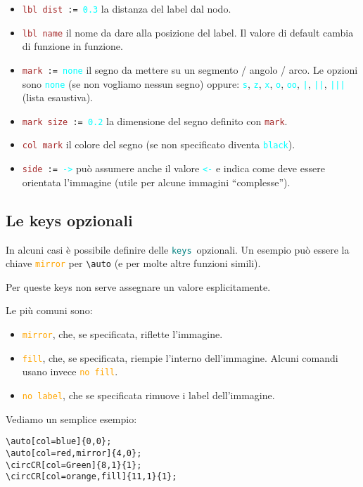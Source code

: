 \documentclass[italian, a4paper]{article}
\newcommand{\bs}{\textbackslash}
\newcommand{\ttt}[1]{\texttt{#1}}
\newcommand{\cyan}[1]{\textcolor{cyan}{#1}}
\newcommand{\keys}{\textcolor{teal}{\ttt{keys}}}
\newcommand{\key}[1]{\textcolor{brown}{\ttt{#1}}}
\newcommand{\keyop}[1]{\textcolor{orange}{\ttt{#1}}}
\newcommand{\keyval}[1]{\cyan{\ttt{#1}}}
\begin{document}
\begin{itemize}
\item \ttt{\key{lbl dist} := \keyval{0.3}} la distanza del label dal nodo.
\item \key{lbl name} il nome da dare alla posizione del label. Il valore di default cambia di funzione in funzione.
\item \ttt{\key{mark} := \keyval{none}} il segno da mettere su un segmento / angolo / arco. Le opzioni sono \keyval{none} (se non vogliamo nessun segno) oppure: \keyval{s}, \keyval{z}, \keyval{x}, \keyval{o}, \keyval{oo}, \keyval{|}, \keyval{||}, \keyval{|||} (lista esaustiva).
\item \ttt{\key{mark size} := \keyval{0.2}} la dimensione del segno definito con \key{mark}.
\item \key{col mark} il colore del segno (se non specificato diventa \keyval{black}).
\item \ttt{\key{side} := \keyval{->}} può assumere anche il valore \keyval{<-} e indica come deve essere orientata l'immagine (utile per alcune immagini ``complesse'').
\end{itemize}

\subsection{Le keys opzionali}
In alcuni casi è possibile definire delle \keys\ opzionali. Un esempio può essere la chiave \keyop{mirror} per \ttt{\bs auto} (e per molte altre funzioni simili).

Per queste keys non serve assegnare un valore esplicitamente.

Le più comuni sono:
\begin{itemize}[nolistsep]
\item \keyop{mirror}, che, se specificata, riflette l'immagine.
\item \keyop{fill}, che, se specificata, riempie l'interno dell'immagine. Alcuni comandi usano invece \keyop{no fill}.
\item \keyop{no label}, che se specificata rimuove i label dell'immagine.
\end{itemize}

Vediamo un semplice esempio:

\begin{Verbatim}[frame=single]
\auto[col=blue]{0,0};
\auto[col=red,mirror]{4,0};
\circCR[col=Green]{8,1}{1};
\circCR[col=orange,fill]{11,1}{1};
\end{Verbatim}
\vspace*{-4mm}
\end{document}
